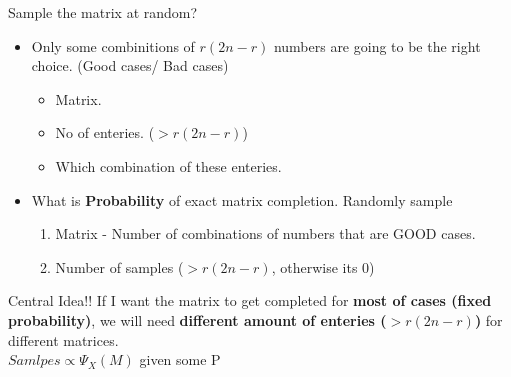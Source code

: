 \documentclass{beamer}
\begin{document}
\begin{frame}{Sample the matrix at random?}

	\begin{itemize}
		\item Only some combinitions of \textbf{$r(2n-r)$} numbers are going to be the right choice. (Good cases/ Bad cases)
		\begin{itemize}
			\item Matrix.
			\item No of enteries. ($>r(2n-r)$)
			\item Which combination of these enteries.
		\end{itemize}
		\vspace {3mm}
		\item What is \textbf{Probability} of exact matrix completion. Randomly sample
		\begin{enumerate}
			\item Matrix - Number of combinations of numbers that are GOOD cases.
			\item Number of samples ($>r(2n-r)$, otherwise its 0)
		\end{enumerate}

	\end{itemize}

	\begin{block}{Central Idea!!}
		If I want the matrix to get completed for \textbf{most of cases (fixed probability)}, we will need \textbf{different amount of enteries ($>r(2n-r)$)} for different matrices. \\
		\center $Samlpes \propto \Psi_X(M)$ given some P
	\end{block}
\end{frame}
\end{document}
